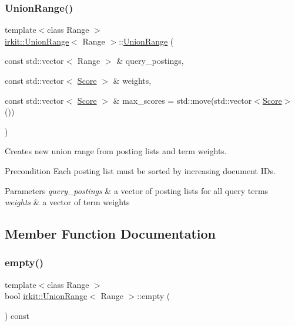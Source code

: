\subsubsection{\texorpdfstring{Union\+Range()}{UnionRange()}}
{\footnotesize\ttfamily template$<$class Range $>$ \\
\hyperlink{classirkit_1_1UnionRange}{irkit\+::\+Union\+Range}$<$ Range $>$\+::\hyperlink{classirkit_1_1UnionRange}{Union\+Range} (\begin{DoxyParamCaption}\item[{const std\+::vector$<$ Range $>$ \&}]{query\+\_\+postings,  }\item[{const std\+::vector$<$ \hyperlink{classirkit_1_1UnionRange_a47fb098a85581f5e33f4203e16245dae}{Score} $>$ \&}]{weights,  }\item[{const std\+::vector$<$ \hyperlink{classirkit_1_1UnionRange_a47fb098a85581f5e33f4203e16245dae}{Score} $>$ \&}]{max\+\_\+scores = {\ttfamily std\+:\+:move(std\+:\+:vector$<$\hyperlink{classirkit_1_1UnionRange_a47fb098a85581f5e33f4203e16245dae}{Score}$>$())} }\end{DoxyParamCaption})\hspace{0.3cm}{\ttfamily [inline]}}



Creates new union range from posting lists and term weights. 

\begin{DoxyPrecond}{Precondition}
Each posting list must be sorted by increasing document I\+Ds. 
\end{DoxyPrecond}

\begin{DoxyParams}{Parameters}
{\em query\+\_\+postings} & a vector of posting lists for all query terms \\
\hline
{\em weights} & a vector of term weights \\
\hline
\end{DoxyParams}


\subsection{Member Function Documentation}
\mbox{\label{classirkit_1_1UnionRange_af12b028d791c9d9821c17ae30084fa86}} 
\subsubsection{\texorpdfstring{empty()}{empty()}}
{\footnotesize\ttfamily template$<$class Range $>$ \\
bool \hyperlink{classirkit_1_1UnionRange}{irkit\+::\+Union\+Range}$<$ Range $>$\+::empty (\begin{DoxyParamCaption}{ }\end{DoxyParamCaption}) const\hspace{0.3cm}{\ttfamily [inline]}}



